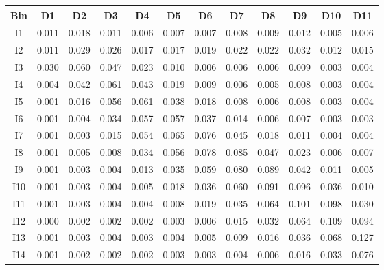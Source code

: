 \begin{tabular}{c@{~~~}c@{~~}c@{~~}c@{~~}c@{~~}c@{~~}c@{~~}c@{~~}c@{~~}c@{~~}c@{~~}c}
\hline 
 \hline 
Bin	& D1 & D2 & D3 & D4 & D5 & D6 & D7 & D8 & D9 & D10 & D11 \\ 
\hline 
I1	&  0.011 &  0.018 &  0.011 &  0.006 &  0.007 &  0.007 &  0.008 &  0.009 &  0.012 &  0.005 &  0.006 \\  
I2	&  0.011 &  0.029 &  0.026 &  0.017 &  0.017 &  0.019 &  0.022 &  0.022 &  0.032 &  0.012 &  0.015 \\  
I3	&  0.030 &  0.060 &  0.047 &  0.023 &  0.010 &  0.006 &  0.006 &  0.006 &  0.009 &  0.003 &  0.004 \\  
I4	&  0.004 &  0.042 &  0.061 &  0.043 &  0.019 &  0.009 &  0.006 &  0.005 &  0.008 &  0.003 &  0.004 \\  
I5	&  0.001 &  0.016 &  0.056 &  0.061 &  0.038 &  0.018 &  0.008 &  0.006 &  0.008 &  0.003 &  0.004 \\  
I6	&  0.001 &  0.004 &  0.034 &  0.057 &  0.057 &  0.037 &  0.014 &  0.006 &  0.007 &  0.003 &  0.003 \\  
I7	&  0.001 &  0.003 &  0.015 &  0.054 &  0.065 &  0.076 &  0.045 &  0.018 &  0.011 &  0.004 &  0.004 \\  
I8	&  0.001 &  0.005 &  0.008 &  0.034 &  0.056 &  0.078 &  0.085 &  0.047 &  0.023 &  0.006 &  0.007 \\  
I9	&  0.001 &  0.003 &  0.004 &  0.013 &  0.035 &  0.059 &  0.080 &  0.089 &  0.042 &  0.011 &  0.005 \\  
I10	&  0.001 &  0.003 &  0.004 &  0.005 &  0.018 &  0.036 &  0.060 &  0.091 &  0.096 &  0.036 &  0.010 \\  
I11	&  0.001 &  0.003 &  0.004 &  0.004 &  0.008 &  0.019 &  0.035 &  0.064 &  0.101 &  0.098 &  0.030 \\  
I12	&  0.000 &  0.002 &  0.002 &  0.002 &  0.003 &  0.006 &  0.015 &  0.032 &  0.064 &  0.109 &  0.094 \\  
I13	&  0.001 &  0.003 &  0.004 &  0.003 &  0.004 &  0.005 &  0.009 &  0.016 &  0.036 &  0.068 &  0.127 \\  
I14	&  0.001 &  0.002 &  0.002 &  0.002 &  0.003 &  0.003 &  0.004 &  0.006 &  0.016 &  0.033 &  0.076 \\  
\hline 
 \hline 
\end{tabular}